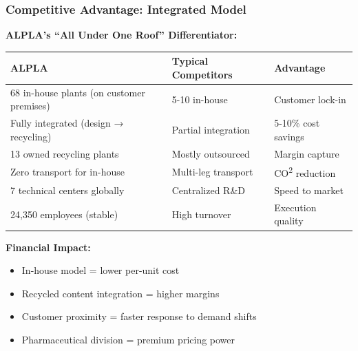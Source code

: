 \documentclass[aspectratio=169,12pt,xcolor=dvipsnames]{beamer}
\newcommand{\highlight}[1]{{\color{alpla_blue}\textbf{#1}}}
\begin{document}
\begin{frame}
  \frametitle{Competitive Advantage: Integrated Model}

  \textbf{ALPLA's \highlight{``All Under One Roof''} Differentiator:}

  \begin{center}
    \begin{tabular}{p{3cm}|p{3cm}|p{3cm}}
      \textbf{ALPLA} & \textbf{Typical Competitors} & \textbf{Advantage} \\
      \hline
      \vspace{0.2cm}
      68 in-house plants (on customer premises) & 5-10 in-house & Customer lock-in \\
      \vspace{0.2cm}
      Fully integrated (design → recycling) & Partial integration & 5-10\% cost savings \\
      \vspace{0.2cm}
      13 owned recycling plants & Mostly outsourced & Margin capture \\
      \vspace{0.2cm}
      Zero transport for in-house & Multi-leg transport & CO\textsuperscript{2} reduction \\
      \vspace{0.2cm}
      7 technical centers globally & Centralized R\&D & Speed to market \\
      \vspace{0.2cm}
      24,350 employees (stable) & High turnover & Execution quality \\
    \end{tabular}
  \end{center}

  \vspace{0.8cm}

  \textbf{Financial Impact:}

  \begin{itemize}
    \item In-house model = lower per-unit cost
    \item Recycled content integration = higher margins
    \item Customer proximity = faster response to demand shifts
    \item Pharmaceutical division = premium pricing power
  \end{itemize}

\end{frame}

\end{document}
